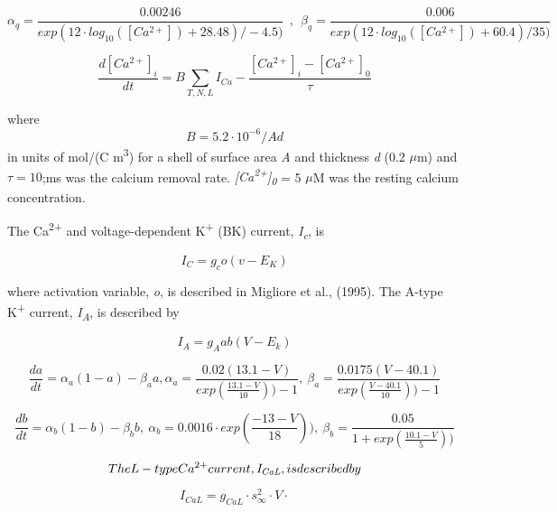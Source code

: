 \documentclass[12pt]{article}
\begin{document}
\begin{equation}
\alpha_q=\frac{0.00246}{exp(12\cdot log_{10}([Ca^{2+}])+28.48)/-4.5)} \ \ ,\ \ 
\beta_q=\frac{0.006}{exp(12\cdot log_{10}([Ca^{2+}])+60.4)/35)}
\end{equation}

\begin{equation}
\frac{d[Ca^{2+}]_i}{dt}=B\sum_{T, N, L}
I_{Ca}-\frac{[Ca^{2+}]_i-[Ca^{2+}]_0}{\tau}
\end{equation}

where
\begin{equation}
B = 5.2\cdot 10^{-6}/Ad
\end{equation}
in units of mol/(C m\textsuperscript{3}) for a shell of
surface area \textit{A} and thickness \textit{d} (0.2 $\mu $m) and  $\tau=10$;ms was the calcium removal rate. \textit{[Ca}\textit{\textsuperscript{2+}}\textit{]}\textit{\textsubscript{0}} = 5 $\mu$M was the resting calcium concentration. 


The Ca\textsuperscript{2+} and voltage-dependent K\textsuperscript{+} (BK) current,
\textit{I}\textit{\textsubscript{c}}, is 


\begin{equation}
I_C=g_co(v-E_K)
\end{equation}


where activation variable, \textit{o}, is described in Migliore et al., (1995). The A-type K\textsuperscript{+} current,
\textit{I}\textit{\textsubscript{A}}, is described by\ \ 


\begin{equation}
I_A=g_A ab (V-E_k)
\end{equation}

\begin{equation}
\frac{da}{dt}=\alpha_a(1-a)-\beta_aa , 
\alpha_a=\frac{0.02(13.1-V)}{exp(\frac{13.1-V}{10}))-1}, \ 
\beta_a=\frac{0.0175(V-40.1)}{exp(\frac{V-40.1}{10}))-1}
\end{equation}

\begin{equation}
\frac{db}{dt}=\alpha_b(1-b)-\beta_bb , \ 
\alpha_b = 0.0016 \cdot exp(\frac{-13-V}{18})), \  \beta_b=\frac{0.05}{1+exp(\frac{10.1-V}{5}))}
\end{equation}

\begin{equation}
The L-type Ca\textsuperscript{2+} current, \textit{I}\textit{\textsubscript{CaL}}, is described by
\end{equation}

\begin{equation}
I_{CaL}=g_{CaL}\cdot s_{\infty }^2\cdot V\cdot
\end{equation}
\end{document}
